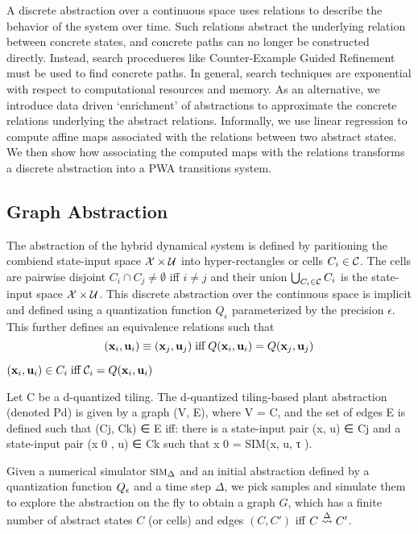 
A discrete abstraction over a continuous space uses relations to
describe the behavior of the system over time. Such relations abstract
the underlying relation between concrete states, and concrete paths
can no longer be constructed directly. Instead, search procedueres
like Counter-Example Guided Refinement must be used to find concrete
paths. In general, search techniques are exponential with respect to
computational resources and memory. As an alternative, we introduce
data driven `enrichment' of abstractions to approximate the concrete
relations underlying the abstract relations. Informally, we use linear
regression to compute affine maps associated with the relations
between two abstract states. We then show how associating the computed
maps with the relations transforms a discrete abstraction into a PWA
transitions system.

\subsection{Graph Abstraction}

The abstraction of the hybrid dynamical system is defined by
paritioning the combiend state-input space $\mathcal{X} \times
\mathcal{U}$ into hyper-rectangles or cells $C_i \in \mathcal{C}$. The cells are
pairwise disjoint $C_i \cap C_j \neq \emptyset$ iff $i \neq j$ and
their union $\bigcup_{C_i\in\mathcal{C}}C_i$ is the state-input
space $\mathcal{X} \times \mathcal{U}$. This discrete abstraction over
the continuous space is implicit and defined using a quantization
function $Q_\epsilon$ parameterized by the precision $\epsilon$.
This further defines an equivalence relations such that
\[
    (\mathbf{x}_i, \mathbf{u}_i) \equiv (\mathbf{x}_j, \mathbf{u}_j) \;\text{iff}\; Q(\mathbf{x}_i,
    \mathbf{u}_i) = Q(\mathbf{x}_j, \mathbf{u}_j)
\]

$(\mathbf{x}_i, \mathbf{u}_i) \in C_i \; \text{iff} \; \mathcal{C}_i = Q(\mathbf{x}_i, \mathbf{u}_i)$

\begin{definition}[] Let C be a d-quantized tiling. The d-quantized
    tiling-based plant abstraction (denoted Pd) is given by a graph
    (V, E), where V = C, and the set of edges E is defined such that
    (Cj, Ck) ∈ E iff: there is a state-input pair (x, u) ∈ Cj and a
state-input pair (x 0 , u) ∈ Ck such that x 0 = SIM(x, u, τ ).
\end{definition}


Given a numerical simulator $\mbox{\sc sim}_\Delta$ and an initial abstraction
defined by a quantization function $Q_\epsilon$ and a time step
$\Delta$, we pick samples and simulate them to explore the abstraction
on the fly to obtain a graph $G$, which has a finite number of
abstract states $C$ (or cells) and edges $(C,C')$ iff $C
\overset{\Delta}{\rightsquigarrow} C'$.


